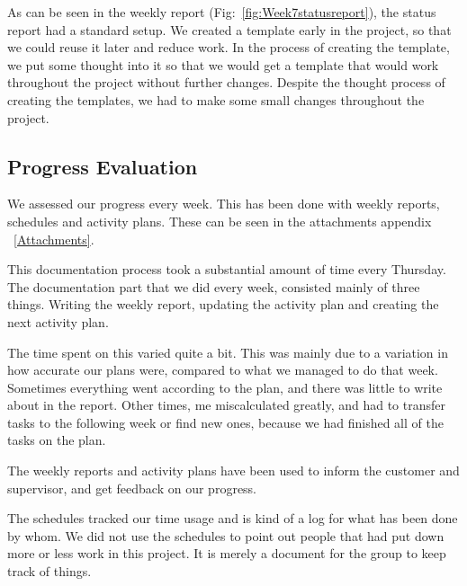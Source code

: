     As can be seen in the weekly report (Fig:~\ref{fig:Week7statusreport}), the status report had a standard setup. We created a template early in the project, so that we could reuse it later and reduce work. In the process of creating the template, we put some thought into it so that we would get a template that would work throughout the project without further changes. Despite the thought process of creating the templates, we had to make some small changes throughout the project.
    
       \subsection{Progress Evaluation}\label{Progress Evaluation}
    We assessed our progress every week. This has been done with weekly reports, schedules and activity plans. These can be seen in the attachments appendix ~\ref{Attachments}.
    
    This documentation process took a substantial amount of time every Thursday. The documentation part that we did every week, consisted mainly of three things. Writing the weekly report, updating the activity plan and creating the next activity plan. 
    
    The time spent on this varied quite a bit. This was mainly due to a variation in how accurate our plans were, compared to what we managed to do that week. Sometimes everything went according to the plan, and there was little to write about in the report. Other times, me miscalculated greatly, and had to transfer tasks to the following week or find new ones, because we had finished all of the tasks on the plan.
    
    The weekly reports and activity plans have been used to inform the customer and supervisor, and get feedback on our progress.
    
    The schedules tracked our time usage and is kind of a log for what has been done by whom. We did not use the schedules to point out people that had put down more or less work in this project. It is merely a document for the group to keep track of things. 
    
    
